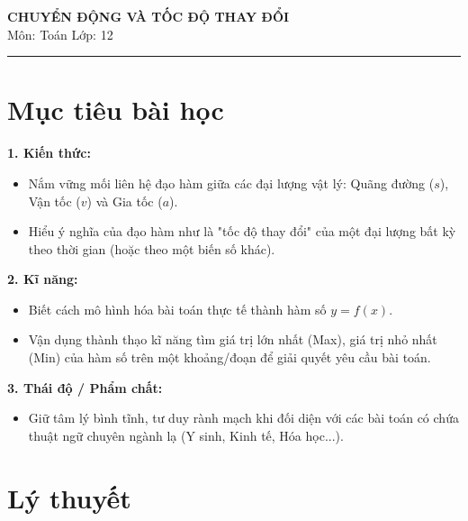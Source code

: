 \documentclass[12pt]{article}
\begin{document}
	
	\begin{center}
		{\LARGE \textbf{CHUYỂN ĐỘNG VÀ TỐC ĐỘ THAY ĐỔI}}\\[8pt]
		{\large Môn: Toán \quad Lớp: 12}
	\end{center}
	\vspace{4mm}
	\hrule
	\vspace{4mm}
	
	\section*{Mục tiêu bài học}
	
	\textbf{1. Kiến thức:}
	\begin{itemize}
		\item Nắm vững mối liên hệ đạo hàm giữa các đại lượng vật lý: Quãng đường ($s$), Vận tốc ($v$) và Gia tốc ($a$).
		\item Hiểu ý nghĩa của đạo hàm như là "tốc độ thay đổi" của một đại lượng bất kỳ theo thời gian (hoặc theo một biến số khác).
	\end{itemize}
	
	\textbf{2. Kĩ năng:}
	\begin{itemize}
		\item Biết cách mô hình hóa bài toán thực tế thành hàm số $y = f(x)$.
		\item Vận dụng thành thạo kĩ năng tìm giá trị lớn nhất (Max), giá trị nhỏ nhất (Min) của hàm số trên một khoảng/đoạn để giải quyết yêu cầu bài toán.
	\end{itemize}
	
	\textbf{3. Thái độ / Phẩm chất:}
	\begin{itemize}
		\item Giữ tâm lý bình tĩnh, tư duy rành mạch khi đối diện với các bài toán có chứa thuật ngữ chuyên ngành lạ (Y sinh, Kinh tế, Hóa học...).
	\end{itemize}
	
	\newpage
	
	\setcounter{tocdepth}{2}
	\tableofcontents
	\newpage
	
	\section{Lý thuyết}
	
\end{document}
